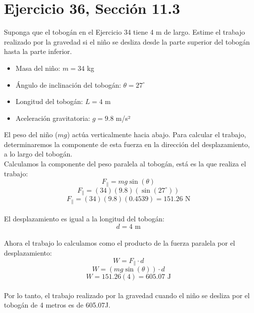 \documentclass[11pt,letterpaper]{article}
\begin{document}
\section{Ejercicio 36, Sección 11.3}

Suponga que el tobogán en el Ejercicio 34 tiene 4 m de largo. Estime el trabajo realizado por la gravedad si el niño se desliza desde la parte superior del tobogán hasta la parte inferior.

\begin{itemize}
    \item Masa del niño: \( m = 34 \) kg
    \item Ángulo de inclinación del tobogán: \( \theta = 27^\circ \)
    \item Longitud del tobogán: \( L = 4 \) m
    \item Aceleración gravitatoria: \( g = 9.8 \) m/s²
\end{itemize}

El peso del niño (\( mg \)) actúa verticalmente hacia abajo. Para calcular el trabajo, determinaremos la componente de esta fuerza en la dirección del desplazamiento, a lo largo del tobogán.
\\
Calculamos la componente del peso paralela al tobogán, está es la que realiza el trabajo:
\\
\begin{equation*}
F_{\parallel} = mg \sin(\theta)
\end{equation*}
\begin{equation*}
F_{\parallel} = (34)  (9.8)  (\sin(27^\circ))
\end{equation*}
\begin{equation*}
F_{\parallel} = (34)  (9.8)  (0.4539) = 151.26 \text{ N}
\end{equation*}
\\
El desplazamiento es igual a la longitud del tobogán:
\begin{equation*}
d = 4 \text{ m}
\end{equation*}
\\
Ahora el trabajo lo calculamos como el producto de la fuerza paralela por el desplazamiento:
\\
\begin{equation*}
W = F_{\parallel} \cdot d
\end{equation*}
\begin{equation*}
W = (mg \sin(\theta)) \cdot d
\end{equation*}
\begin{equation*}
W = 151.26 ( 4) = 605.07 \text{ J}
\end{equation*}
\\
Por lo tanto, el trabajo realizado por la gravedad cuando el niño se desliza por el tobogán de 4 metros es de 605.07J.
\end{document}
